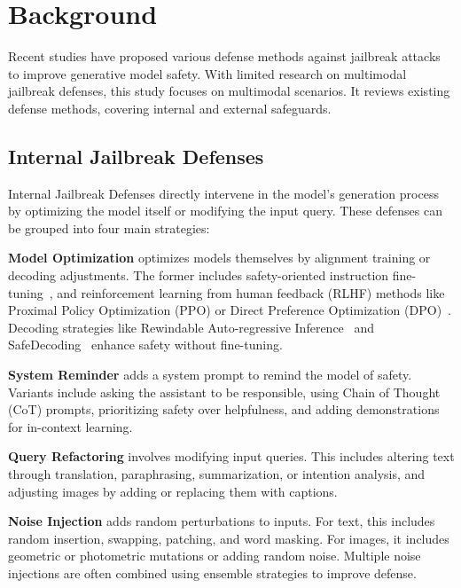\section{Background}
Recent studies have proposed various defense methods against jailbreak attacks to improve generative model safety. With limited research on multimodal jailbreak defenses, this study focuses on multimodal scenarios. It reviews existing defense methods, covering internal and external safeguards.

\subsection{Internal Jailbreak Defenses}
\label{internal_defense_background}
Internal Jailbreak Defenses directly intervene in the model's generation process by optimizing the model itself or modifying the input query. These defenses can be grouped into four main strategies:

\textbf{Model Optimization} optimizes models themselves by alignment training or decoding adjustments. The former includes safety-oriented instruction fine-tuning~\cite{bianchi2023safety,zong2024safety}, and reinforcement learning from human feedback (RLHF) methods like Proximal Policy Optimization (PPO) or Direct Preference Optimization (DPO)~\cite{zhang2024spa}. Decoding strategies like Rewindable Auto-regressive Inference~\cite{li2023rain} and SafeDecoding~\cite{xu2024safedecoding} enhance safety without fine-tuning. 

\textbf{System Reminder} adds a system prompt to remind the model of safety. Variants include asking the assistant to be responsible\cite{xie2023defending}, using Chain of Thought (CoT) prompts\cite{wang2024adashield}, prioritizing safety over helpfulness\cite{zhang2023defending}, and adding demonstrations for in-context learning\cite{wei2023jailbreak}.

\textbf{Query Refactoring} involves modifying input queries. This includes altering text through translation, paraphrasing, summarization\cite{ji2024defending}, or intention analysis\cite{zhang2024intentionanalysismakesllms}, and adjusting images by adding or replacing them with captions\cite{gou2024eyes}.

\textbf{Noise Injection} adds random perturbations to inputs. For text, this includes random insertion, swapping, patching\cite{robey2023smoothllm}, and word masking\cite{cao2023defending}. For images, it includes geometric or photometric mutations\cite{zhang2024jailguarduniversaldetectionframework} or adding random noise\cite{xu2024defending}. Multiple noise injections are often combined using ensemble strategies to improve defense.


